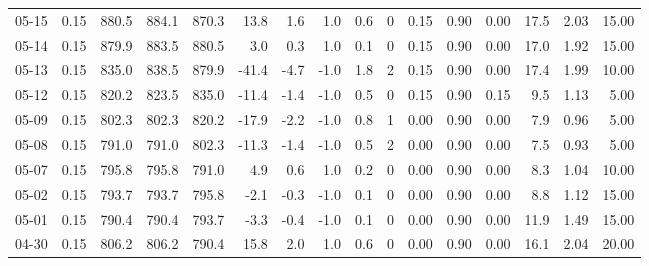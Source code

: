 \begin{threeparttable}
{\begin{tabular}{lrrrrrrrrrrrrrrr}
  05-15 &     0.15 & 880.5 & 884.1 & 870.3 &       13.8 &            1.6 &                      1.0 &                 0.6 &              0 &       0.15 &      0.90 &           0.00 &             17.5 &            2.03 &                  15.00 \\
  05-14 &     0.15 & 879.9 & 883.5 & 880.5 &        3.0 &            0.3 &                      1.0 &                 0.1 &              0 &       0.15 &      0.90 &           0.00 &             17.0 &            1.92 &                  15.00 \\
  05-13 &     0.15 & 835.0 & 838.5 & 879.9 &      -41.4 &           -4.7 &                     -1.0 &                 1.8 &              2 &       0.15 &      0.90 &           0.00 &             17.4 &            1.99 &                  10.00 \\
  05-12 &     0.15 & 820.2 & 823.5 & 835.0 &      -11.4 &           -1.4 &                     -1.0 &                 0.5 &              0 &       0.15 &      0.90 &           0.15 &              9.5 &            1.13 &                   5.00 \\
  05-09 &     0.15 & 802.3 & 802.3 & 820.2 &      -17.9 &           -2.2 &                     -1.0 &                 0.8 &              1 &       0.00 &      0.90 &           0.00 &              7.9 &            0.96 &                   5.00 \\
  05-08 &     0.15 & 791.0 & 791.0 & 802.3 &      -11.3 &           -1.4 &                     -1.0 &                 0.5 &              2 &       0.00 &      0.90 &           0.00 &              7.5 &            0.93 &                   5.00 \\
  05-07 &     0.15 & 795.8 & 795.8 & 791.0 &        4.9 &            0.6 &                      1.0 &                 0.2 &              0 &       0.00 &      0.90 &           0.00 &              8.3 &            1.04 &                  10.00 \\
  05-02 &     0.15 & 793.7 & 793.7 & 795.8 &       -2.1 &           -0.3 &                     -1.0 &                 0.1 &              0 &       0.00 &      0.90 &           0.00 &              8.8 &            1.12 &                  15.00 \\
  05-01 &     0.15 & 790.4 & 790.4 & 793.7 &       -3.3 &           -0.4 &                     -1.0 &                 0.1 &              0 &       0.00 &      0.90 &           0.00 &             11.9 &            1.49 &                  15.00 \\
  04-30 &     0.15 & 806.2 & 806.2 & 790.4 &       15.8 &            2.0 &                      1.0 &                 0.6 &              0 &       0.00 &      0.90 &           0.00 &             16.1 &            2.04 &                  20.00 \\

\end{tabular}}
\end{threeparttable}
